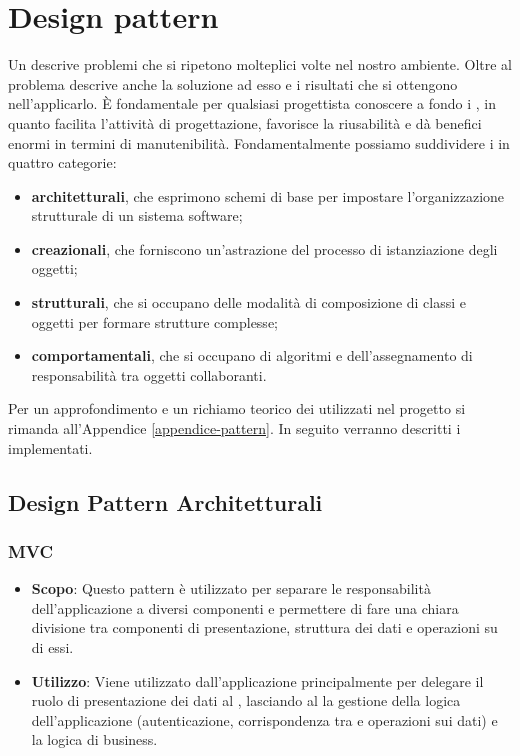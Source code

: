 \section{Design pattern}

Un  descrive problemi che si ripetono molteplici volte nel nostro ambiente. Oltre al problema descrive anche la soluzione ad esso e i risultati che si ottengono nell'applicarlo. È fondamentale per qualsiasi progettista conoscere a fondo i , in quanto facilita l'attività di progettazione, favorisce la riusabilità e dà benefici enormi in termini di manutenibilità. Fondamentalmente possiamo suddividere i  in quattro categorie:

\begin{itemize}

	\item \textbf{ architetturali}, che esprimono schemi di base per impostare l'organizzazione strutturale di un sistema software;
	\item \textbf{ creazionali}, che forniscono un'astrazione del processo di istanziazione degli oggetti;
	\item \textbf{ strutturali}, che si occupano delle modalità di composizione di classi e oggetti per formare strutture complesse; 
	\item \textbf{ comportamentali}, che si occupano di algoritmi e dell'assegnamento di responsabilità tra oggetti collaboranti.

\end{itemize}

Per un approfondimento e un richiamo teorico dei  utilizzati nel progetto  si rimanda all'Appendice \ref{appendice-pattern}. In seguito verranno descritti i  implementati.

\subsection{Design Pattern Architetturali}

\subsubsection{MVC}

\begin{itemize}

	\item \textbf{Scopo}: Questo pattern è utilizzato per separare le responsabilità dell'applicazione a diversi componenti e permettere di fare una chiara divisione tra componenti di presentazione, struttura dei dati e operazioni su di essi.
	\item \textbf{Utilizzo}: Viene utilizzato dall'applicazione principalmente per delegare il ruolo di presentazione dei dati al , lasciando al  la gestione della logica dell'applicazione (autenticazione, corrispondenza tra  e operazioni sui dati) e la logica di business.
	
\end{itemize}

